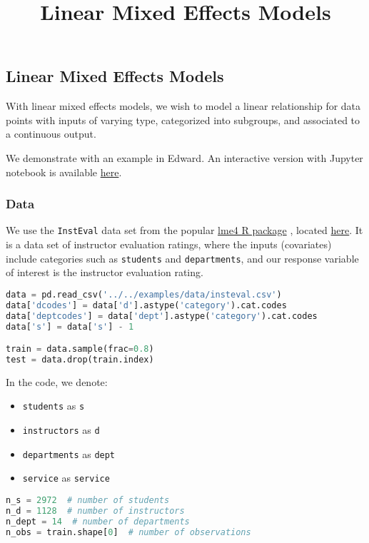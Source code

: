 \title{Linear Mixed Effects Models}

\subsection{Linear Mixed Effects Models}

With linear mixed effects models, we wish to model a linear
relationship for data points with inputs of varying type, categorized
into subgroups, and associated to a continuous output.

We demonstrate with an example in Edward.
An interactive version with Jupyter notebook is available
\href{http://nbviewer.jupyter.org/github/blei-lab/edward/blob/master/docs/notebooks/linear_mixed_effects_models.ipynb}{here}.

\subsubsection{Data}

We use the \texttt{InstEval} data set from the popular
\href{http://lme4.r-forge.r-project.org}{lme4 R package}
\citep{bates2015fitting}, located
\href{https://github.com/blei-lab/edward/blob/master/examples/data/insteval.csv}{here}.
It is a data set of instructor evaluation ratings, where the inputs
(covariates) include categories such as \texttt{students} and
\texttt{departments}, and our response variable of interest is the
instructor evaluation rating.

\begin{lstlisting}[language=Python]
data = pd.read_csv('../../examples/data/insteval.csv')
data['dcodes'] = data['d'].astype('category').cat.codes
data['deptcodes'] = data['dept'].astype('category').cat.codes
data['s'] = data['s'] - 1

train = data.sample(frac=0.8)
test = data.drop(train.index)
\end{lstlisting}

In the code, we denote:
\begin{itemize}
\item \texttt{students} as \texttt{s}
\item \texttt{instructors} as \texttt{d}
\item \texttt{departments} as \texttt{dept}
\item \texttt{service} as \texttt{service}
\end{itemize}

\begin{lstlisting}[language=Python]
n_s = 2972  # number of students
n_d = 1128  # number of instructors
n_dept = 14  # number of departments
n_obs = train.shape[0]  # number of observations
\end{lstlisting}

